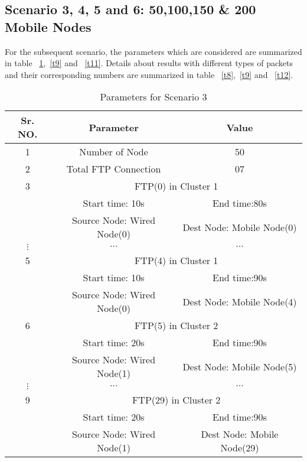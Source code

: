 \documentclass[3p,times]{elsarticle}
\begin{document}
\subsection{Scenario 3, 4, 5 and 6: 50,100,150 \& 200 Mobile Nodes}
For the subsequent scenario, the parameters which are considered are summarized in table ~\ref{t7},~\ref{t9} and ~\ref{t11}. Details about results with different types of packets and their corresponding numbers are summarized in table  ~\ref{t8},~\ref{t9} and ~\ref{t12}.
\begin{table}[t]
\centering
\caption{Parameters for Scenario 3}
\label{t7}
\begin{tabular}{|c|c|c|}
\hline
Sr. NO. & Parameter & Value \\
\hline
1 & Number of Node & 50 \\
2& Total FTP Connection & 07 \\
\hline
3 & \multicolumn{2}{|c|}{ FTP(0) in Cluster 1} \\
 & Start time: 10s &  End time:80s\\
 & Source Node: Wired Node(0) & Dest Node: Mobile Node(0) \\
\hline
$ \vdots $ & $ \cdots $ & $ \cdots $ \\
\hline
5 & \multicolumn{2}{|c|}{ FTP(4) in Cluster 1} \\
 & Start time: 10s &  End time:90s\\
 & Source Node: Wired Node(0) & Dest Node: Mobile Node(4) \\
\hline
6 & \multicolumn{2}{|c|}{ FTP(5) in Cluster 2} \\
 & Start time: 20s &  End time:90s\\
 & Source Node: Wired Node(1) & Dest Node: Mobile Node(5) \\
\hline
$ \vdots $ & $ \cdots $ & $ \cdots $ \\
\hline
9 & \multicolumn{2}{|c|}{ FTP(29) in Cluster 2} \\
 & Start time: 20s &  End time:90s\\
 & Source Node: Wired Node(1) & Dest Node: Mobile Node(29) \\
\hline
\end{tabular}
\end{table}
\end{document}
